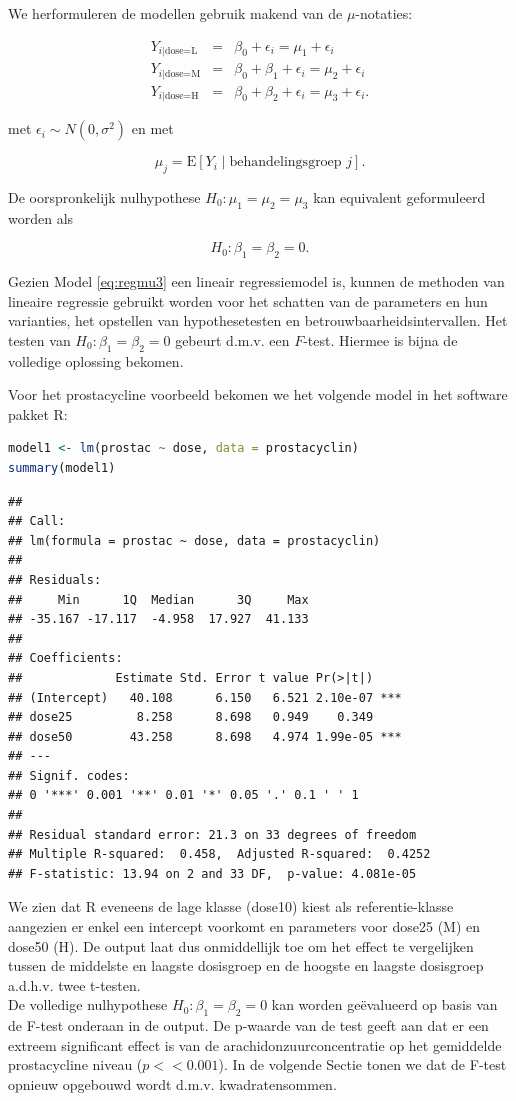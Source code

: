 \documentclass[
  12pt,dutch,coursenotes]{book}
\begin{document}
We herformuleren de modellen gebruik makend van de \(\mu\)-notaties:

\begin{eqnarray*}
 Y_{i\vert \text{dose=L}} &=& \beta_0+\epsilon_i = \mu_1+\epsilon_i \\
 Y_{i\vert \text{dose=M}} &=& \beta_0+\beta_1+ \epsilon_i = \mu_2+\epsilon_i \\
 Y_{i\vert \text{dose=H}} &=& \beta_0+\beta_2 + \epsilon_i = \mu_3+\epsilon_i .
\end{eqnarray*}

met \(\epsilon_i \sim N(0,\sigma^2)\) en met

\[  \mu_j = \text{E}\left[Y_i \mid \text{behandelingsgroep } j\right].\]

De oorspronkelijk nulhypothese \(H_0:\mu_1=\mu_2=\mu_3\) kan equivalent geformuleerd worden als

\[H_0: \beta_1=\beta_2=0.\]

Gezien Model \eqref{eq:regmu3} een lineair regressiemodel is, kunnen de methoden van lineaire regressie gebruikt worden voor het schatten van de parameters en hun varianties, het opstellen van hypothesetesten en betrouwbaarheidsintervallen.
Het testen van \(H_0: \beta_1=\beta_2=0\) gebeurt d.m.v. een \(F\)-test.
Hiermee is bijna de volledige oplossing bekomen.

Voor het prostacycline voorbeeld bekomen we het volgende model in het software pakket R:

\begin{lstlisting}[language=R]
model1 <- lm(prostac ~ dose, data = prostacyclin)
summary(model1)
\end{lstlisting}

\begin{lstlisting}
## 
## Call:
## lm(formula = prostac ~ dose, data = prostacyclin)
## 
## Residuals:
##     Min      1Q  Median      3Q     Max 
## -35.167 -17.117  -4.958  17.927  41.133 
## 
## Coefficients:
##             Estimate Std. Error t value Pr(>|t|)    
## (Intercept)   40.108      6.150   6.521 2.10e-07 ***
## dose25         8.258      8.698   0.949    0.349    
## dose50        43.258      8.698   4.974 1.99e-05 ***
## ---
## Signif. codes:  
## 0 '***' 0.001 '**' 0.01 '*' 0.05 '.' 0.1 ' ' 1
## 
## Residual standard error: 21.3 on 33 degrees of freedom
## Multiple R-squared:  0.458,  Adjusted R-squared:  0.4252 
## F-statistic: 13.94 on 2 and 33 DF,  p-value: 4.081e-05
\end{lstlisting}

We zien dat R eveneens de lage klasse (dose10) kiest als referentie-klasse aangezien er enkel een intercept voorkomt en parameters voor dose25 (M) en dose50 (H).
De output laat dus onmiddellijk toe om het effect te vergelijken tussen de middelste en laagste dosisgroep en de hoogste en laagste dosisgroep a.d.h.v. twee t-testen.\\
De volledige nulhypothese \(H_0: \beta_1=\beta_2=0\) kan worden geëvalueerd op basis van de F-test onderaan in de output.
De p-waarde van de test geeft aan dat er een extreem significant effect is van de arachidonzuurconcentratie op het gemiddelde prostacycline niveau (\(p<<0.001\)).
In de volgende Sectie tonen we dat de F-test opnieuw opgebouwd wordt d.m.v. kwadratensommen.
\end{document}
